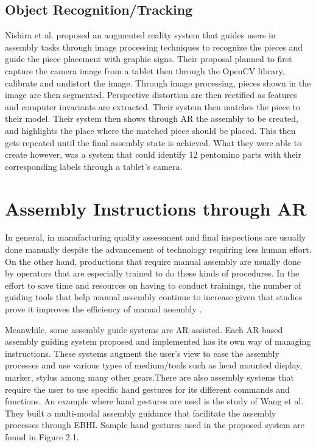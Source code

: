 \subsection{Object Recognition/Tracking}
Nishira et al. proposed an augmented reality system that guides users in assembly tasks through image processing techniques to recognize the pieces and guide the piece placement with graphic signs\cite{nishihara_okamoto_2015}. Their proposal planned to first capture the camera image from a tablet then through the OpenCV library\cite{791289}, calibrate and undistort the image. Through image processing, pieces shown in the image are then segmented. Perspective distortion are then rectified as features and computer invariants are extracted. Their system then matches the piece to their model. Their system then shows through AR the assembly to be created, and highlights the place where the matched piece should be placed. This then gets repeated until the final assembly state is achieved. What they were able to create however, was a system that could identify 12 pentomino parts with their corresponding labels through a tablet's camera.

\section{Assembly Instructions through AR}
In general, in manufacturing quality assessment and final inspections are usually done manually despite the advancement of technology requiring less human effort. On the other hand, productions that require manual assembly are usually done by operators that are especially trained to do these kinds of procedures. In the effort to save time and resources on having to conduct trainings, the number of guiding tools that help manual assembly continue to increase given that studies prove it improves the efficiency of manual assembly \cite{Wang2016406}.

Meanwhile, some assembly guide systems are AR-assisted. Each AR-based assembly guiding system proposed and implemented has its own way of managing instructions. These systems augment the user's view to ease the assembly processes and use various types of medium\slash tools such as head mounted display, marker, stylus among many other gears.There are also assembly systems that require the user to use specific hand gestures for its different commands and functions. An example where hand gestures are used is the study of Wang et al. They built a multi-modal assembly guidance that facilitate the assembly processes through EBHI. Sample hand gestures used in the proposed system are found in Figure 2.1.

